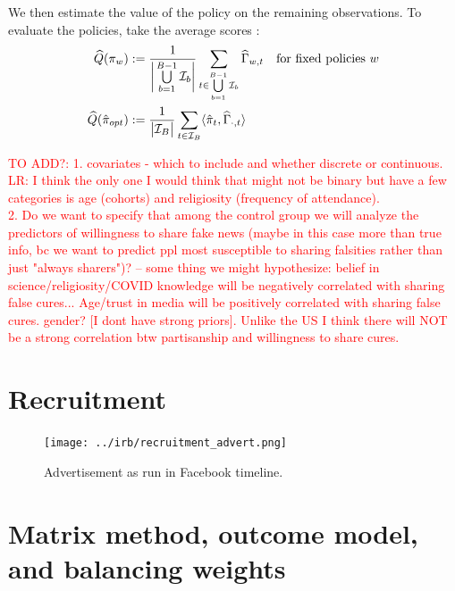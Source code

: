 \documentclass[letterpaper, 12pt, parskip=full,DIV=12]{scrartcl}
\begin{document}
We then estimate the value of the policy on the remaining observations. To evaluate the policies, take the average scores :
    \begin{align*}
          \widehat{Q}({\pi}_{w})  &:= \frac{1}{\bigg{\lvert} \bigcup\limits_{b=1}^{B-1} \mathcal{I}_{b} \bigg{\rvert}} \sum_{t \in \bigcup\limits_{b=1}^{B-1} \mathcal{I}_{b} } \widehat{\Gamma}_{w,t} \quad \text{for fixed policies $w$}\\
                     \widehat{Q}(\hat{\pi}_{opt})  &:= \frac{1}{\big{\lvert}  \mathcal{I}_{B} \big{\rvert}} \sum_{t \in \mathcal{I}_{B} }
                      \langle \hat{\pi}_{t}, \widehat{\Gamma}_{\cdot, t}  \rangle 
    \end{align*}




\textcolor{red}{TO ADD?: 1. covariates - which to include and whether discrete or continuous. LR: I think the only one I would think that might not be binary but have a few categories is age (cohorts) and religiosity (frequency of attendance).\\ 2. Do we want to specify that among the control group we will analyze the predictors of willingness to share fake news (maybe in this case more than true info, bc we want to predict ppl most susceptible to sharing falsities rather than just "always sharers")? -- some thing we might hypothesize: belief in science/religiosity/COVID knowledge will be negatively correlated with sharing false cures... Age/trust in media will be positively correlated with sharing false cures. gender? [I dont have strong priors]. Unlike the US I think there will NOT be a strong correlation btw partisanship and willingness to share cures.}





\clearpage



\clearpage
\appendix

\section{Recruitment}\label{recruitment}

\begin{figure}[htb]
\centering
\caption{Advertisement as run in Facebook timeline.}
\label{fig:ad}
\texttt{[image: ../irb/recruitment\_advert.png]}
\end{figure}


\section{Matrix method, outcome model, and balancing weights}
\end{document}
